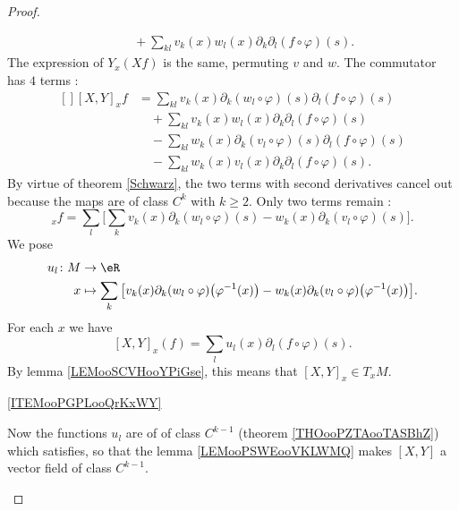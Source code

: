 \begin{proof}
\begin{subproof}
\begin{subequations}
\begin{align}
                    &\quad+\sum_{kl}v_k(x)w_l(x)\partial_k\partial_l(f\circ\varphi)(s).
                \end{align}
            \end{subequations}
            The expression of \( Y_x(Xf)\) is the same, permuting \( v\) and \( w\). The commutator has \( 4\) terms :
            \begin{equation}
                \begin{aligned}[]
                    [X,Y]_xf&=\sum_{kl}v_k(x)\partial_k(w_l\circ\varphi)(s)\partial_l(f\circ\varphi)(s)\\
                    &\quad+\sum_{kl}v_k(x)w_l(x)\partial_k\partial_l(f\circ\varphi)(s)\\
                    &\quad -\sum_{kl}w_k(x)\partial_k(v_l\circ\varphi)(s)\partial_l(f\circ\varphi)(s)\\
                    &\quad -\sum_{kl}w_k(x)v_l(x)\partial_k\partial_l(f\circ\varphi)(s).
                \end{aligned}
            \end{equation}
            By virtue of theorem \ref{Schwarz}, the two terms with second derivatives cancel out because the maps are of class \( C^k\) with \( k\geq 2\). Only two terms remain :
            \begin{equation}
                [X,Y]_xf=\sum_l\big[ \sum_kv_k(x)\partial_k(w_l\circ\varphi)(s)-w_k(x)\partial_k(v_l\circ\varphi)(s) \big].
            \end{equation}
            We pose
            \begin{equation}
                \begin{aligned}
                    u_l\colon M&\to \eR \\
                    x&\mapsto  \sum_k\big[ v_k(x)\partial_k(w_l\circ\varphi)\big( \varphi^{-1}(x) \big)-w_k(x)\partial_k(v_l\circ\varphi)\big( \varphi^{-1}(x) \big) \big].
                \end{aligned}
            \end{equation}
            For each \( x\) we have
            \begin{equation}        \label{EQooVUOKooAyGoae}
                [X,Y]_x(f)=\sum_lu_l(x)\partial_l(f\circ\varphi)(s).
            \end{equation}
            By lemma \ref{LEMooSCVHooYPiGse}, this means that \( [X,Y]_x\in T_xM\).

        \item[\ref{ITEMooPGPLooQrKxWY}]

            Now the functions \( u_l\) are of of class \( C^{k-1}\) (theorem \ref{THOooPZTAooTASBhZ}) which satisfies, so that the lemma \ref{LEMooPSWEooVKLWMQ} makes \( [X,Y] \) a vector field of class \( C^{k-1}\).
    \end{subproof}
\end{proof}

